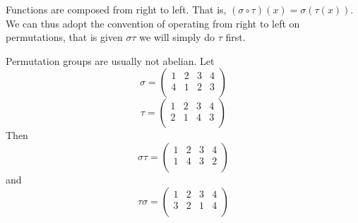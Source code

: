 \documentclass[12pt, letterpaper]{report}
\begin{document}
\begin{remark}
	Functions are composed from right to left. That is, \((\sigma \circ \tau )(x)=\sigma (\tau (x))\). We can thus adopt the convention of operating from right to left on permutations, that is given \(\sigma \tau \) we will simply do \(\tau \) first.
\end{remark}
\begin{eg}
	Permutation groups are usually not abelian. Let 
	\[
		\sigma =\begin{pmatrix}
			1 &2  &3  &4   \\
			 4&1  &2  &3   \\
		\end{pmatrix}
	\]
	\[
		\tau =\begin{pmatrix}
			1 &2  &3  &4   \\
			 2&1  &4  &3   \\
		\end{pmatrix}
	\]
	Then 
	\[
		\sigma \tau =\begin{pmatrix}
			1 &2  &3  &4   \\
			 1&4  &3  &2   \\
		\end{pmatrix}
	\]
	and
	\[
		\tau \sigma =\begin{pmatrix}
			1 &2  &3  &4   \\
			 3&2  &1  &4   \\
		\end{pmatrix}
	\]
\end{eg}
\end{document}

